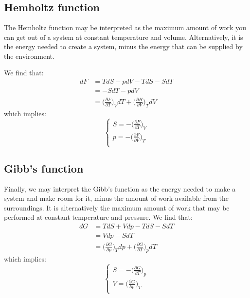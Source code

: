 \documentclass[a4paper,11pt,oneside]{book}
\begin{document}
\subsection*{Hemholtz function}
The Hemholtz function may be interpreted as the maximum amount of work you can get out of a system at constant temperature and volume. Alternatively, it is the energy needed to create a system, minus the energy that can be supplied by the environment. 


We find that:
\begin{align}
    dF &= TdS - pdV - TdS - S dT \\
    &= -S dT - p dV\\
    &=\bigg(\frac{\partial F}{\partial T}\bigg)_V dT + \bigg(\frac{\partial H}{\partial V}\bigg)_T dV  
\end{align}
which implies:
\begin{equation}
    \begin{cases}
    S = -\big(\frac{\partial F}{\partial T}\big)_V \\
    p = -\big(\frac{\partial F}{\partial V}\big)_T\\
\end{cases}
\end{equation}

\subsection*{Gibb's function}
Finally, we may interpret the Gibb's function as the energy needed to make a system and make room for it, minus the amount of work available from the surroundings. It is alternatively the maximum amount of work that may be performed at constant temperature and pressure. 
We find that:
\begin{align}
    dG &= TdS + Vdp - TdS - SdT \\
    &= Vdp - S dT\\
    &=\bigg(\frac{\partial G}{\partial p}\bigg)_T dp + \bigg(\frac{\partial G}{\partial T}\bigg)_p dT
\end{align}
which implies:
\begin{equation}
    \begin{cases}
    S = -\big(\frac{\partial G}{\partial T}\big)_p \\
    V = \big(\frac{\partial G}{\partial p}\big)_T\\
\end{cases} 
\end{equation}
\end{document}
